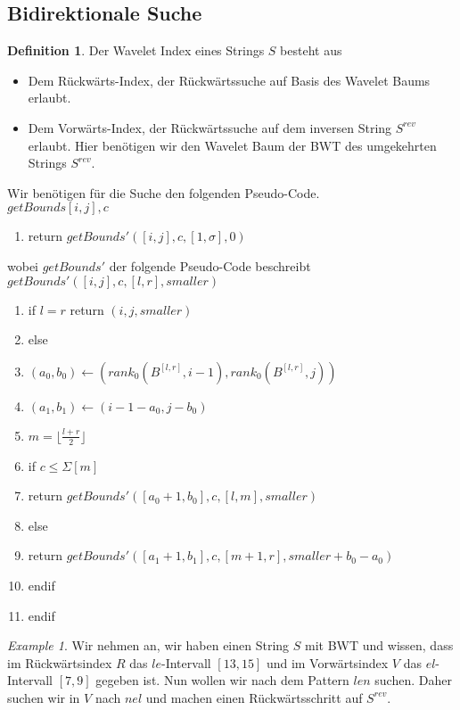 \documentclass[a4paper, 12pt]{article}
\theoremstyle{plain}
\theoremstyle{definition}
\newtheorem{definition}[theorem]{Definition} %
\theoremstyle{lemma}
\theoremstyle{remark}
\theoremstyle{corollary}
\theoremstyle{example}
\newtheorem{example}[theorem]{Example}
\begin{document}
	\subsection{Bidirektionale Suche}
	\begin{definition}
		Der Wavelet Index eines Strings $S$ besteht aus \begin{itemize}
			\item Dem Rückwärts-Index, der Rückwärtssuche auf Basis des Wavelet Baums erlaubt.
			\item Dem Vorwärts-Index, der Rückwärtssuche auf dem inversen String $S^{rev}$ erlaubt. Hier benötigen wir den Wavelet Baum der BWT des umgekehrten Strings $S^{rev}$.
		\end{itemize}
	\end{definition}
	Wir benötigen für die Suche den folgenden Pseudo-Code.\\
	\underline{$getBounds[i,j],c$}
	\begin{enumerate}
		\item return $getBounds'([i,j],c,[1,\sigma],0)$
	\end{enumerate}
	wobei $getBounds'$ der folgende Pseudo-Code beschreibt\\
	\underline{$getBounds'([i,j],c,[l,r],smaller)$}
	\begin{enumerate}
		\item if $l=r$ return $(i,j,smaller)$
		\item else
		\item $(a_0,b_0) \gets (rank_0(B^{[l,r]},i-1),rank_0(B^{[l,r]},j))$
		\item $(a_1,b_1) \gets (i-1-a_0,j-b_0)$
		\item $m = \lfloor \frac{l+r}{2}\rfloor$
		\item if $c \leq \Sigma[m]$
		\item return $getBounds'([a_0+1,b_0],c,[l,m],smaller)$
		\item else
		\item return $getBounds'([a_1+1,b_1],c,[m+1,r],smaller+b_0-a_0)$
		\item endif
		\item endif
	\end{enumerate}
	\begin{example}
		Wir nehmen an, wir haben einen String $S$ mit BWT und wissen, dass im Rückwärtsindex $R$ das $le$-Intervall $[13,15]$ und im Vorwärtsindex $V$ das $el$-Intervall $[7,9]$ gegeben ist. Nun wollen wir nach dem Pattern $len$ suchen. Daher suchen wir in $V$ nach $nel$ und machen einen Rückwärtsschritt auf $S^{rev}$.
	\end{example}
\end{document}

